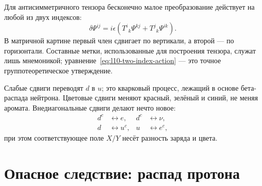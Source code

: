 Для антисимметричного тензора бесконечно малое преобразование действует на любой из двух индексов:
\begin{equation}
\delta\Psi^{ij}
=
i\epsilon
\left(
T^i{}_k\Psi^{kj}
+
T^j{}_k\Psi^{ik}
\right).
\label{eq:l10-two-index-action}
\end{equation}
В матричной картине первый член сдвигает по вертикали, а второй — по горизонтали. Составные метки, использованные для построения тензора, служат лишь мнемоникой; уравнение~\eqref{eq:l10-two-index-action} — это точное группотеоретическое утверждение.

Слабые сдвиги переводят \(d\) в \(u\); это кварковый процесс, лежащий в основе бета-распада нейтрона. Цветовые сдвиги меняют красный, зелёный и синий, не меняя аромата. Внедиагональные сдвиги делают нечто новое:
\begin{equation}
\begin{aligned}
d^c&\longleftrightarrow e,
& d^c&\longleftrightarrow\nu,\\
d&\longleftrightarrow u^c,
& u&\longleftrightarrow e^c,
\end{aligned}
\label{eq:l10-leptoquark-shifts}
\end{equation}
при этом соответствующее поле \(X/Y\) несёт разность заряда и цвета.

\begin{classroomqa}
\end{classroomqa}

\begin{classroomqa}
\end{classroomqa}

\section{Опасное следствие: распад протона}

